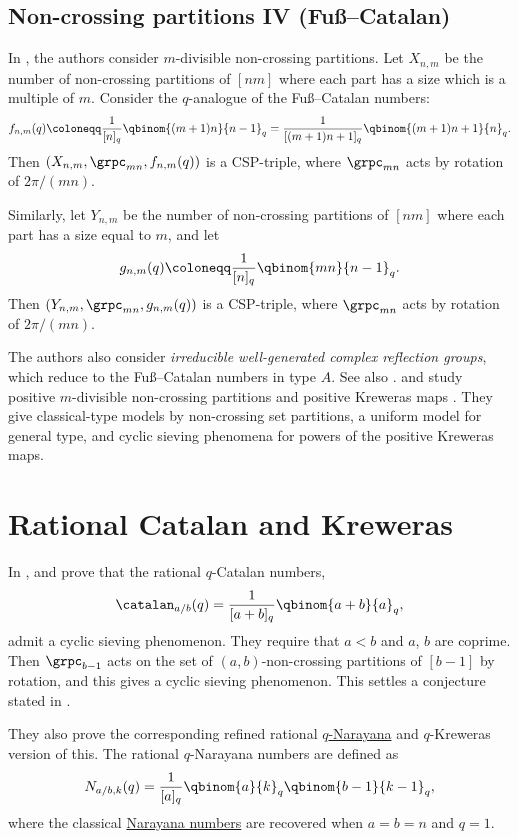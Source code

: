 \subsection[cspNonCrossingPartitionsFuss]{Non-crossing partitions IV (Fuß--Catalan)}

In \cite{KrattenthalerMuller2013}, the authors consider $m$-divisible
non-crossing partitions.
Let $X_{n,m}$ be the number of non-crossing partitions of $[nm]$
where each part has a size which is a multiple of $m$.
Consider the $q$-analogue of the Fuß--Catalan numbers:
\[
f_{n,m}(q)
\coloneqq
\frac{1}{[n]_q} \qbinom{(m+1)n}{n-1}_q
=
\frac{1}{[(m+1)n+1]_q}\qbinom{(m+1)n+1}{n}_q.
\]
Then $(X_{n,m},\grpc_{mn},f_{n,m}(q))$ is a CSP-triple,
where $\grpc_{mn}$ acts by rotation of $2\pi/(mn)$.


Similarly, let $Y_{n,m}$ be the number of non-crossing partitions of $[nm]$
where each part has a size equal to $m$, and let
\[
g_{n,m}(q) \coloneqq \frac{1}{[n]_q} \qbinom{mn}{n-1}_q.
\]
Then $(Y_{n,m},\grpc_{mn},g_{n,m}(q))$ is a CSP-triple,
where $\grpc_{mn}$ acts by rotation of $2\pi/(mn)$.


The authors also consider \emph{irreducible well-generated complex reflection groups},
which reduce to the Fuß--Catalan numbers in type $A$.
See also \cite{ReinerSommers2018}.
 and  study positive
$m$-divisible non-crossing partitions and positive Kreweras maps
\cite{KrattenthalerStump2025PositiveDivisible}.  They give classical-type
models by non-crossing set partitions, a uniform model for general type, and
cyclic sieving phenomena for powers of the positive Kreweras maps.


\section[cspRationalCatalan]{Rational Catalan and Kreweras}

In \cite{BodnarRhoades2016},  and
 prove
that the rational $q$-Catalan numbers,
\[
\catalan_{a/b}(q) = \frac{1}{[a+b]_q} \qbinom{a+b}{a}_q,
\]
admit a cyclic sieving phenomenon.  They require that $a\lt b$ and $a$, $b$
are coprime.
Then $\grpc_{b-1}$ acts on the set of $(a,b)$-non-crossing
partitions of $[b-1]$ by rotation, and this gives a cyclic sieving phenomenon.
This settles a conjecture stated in \cite{Armstrong2012}.

They also prove the corresponding refined
rational \hyperref[qNarayana]{$q$-Narayana} and $q$-Kreweras version of this.
The rational $q$-Narayana numbers are defined as
\[
N_{a/b,k}(q) = \frac{1}{[a]_q} \qbinom{a}{k}_q \qbinom{b-1}{k-1}_q,
\]
where the classical \hyperref[prelimQanalogsCatalan]{Narayana numbers} are
recovered when $a=b=n$ and $q=1$.

